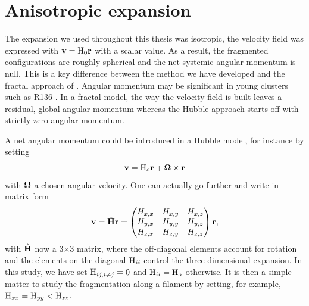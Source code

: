 \section{Anisotropic expansion}

The \HubLem expansion we used throughout this thesis was isotropic, the velocity field was expressed with $\bold{v} = {\textrm{H}}_0 \bold{r}$ with \tHub a scalar value. As a result, the fragmented configurations are roughly spherical and the net systemic angular momentum is null. This is a key difference between the method we have developed and the fractal approach of \cite{Goodwin2004}. Angular momentum may be significant in young clusters such as R136 \citep{Henault-Brunet2012}. In a fractal model, the way the velocity field is built leaves a residual, global angular momentum whereas the Hubble approach starts off with strictly zero angular momentum.

 A net angular momentum could be introduced in a Hubble model, for instance by setting 
\begin{equation}
\bold{v} = {\textrm{H}}_o \bold{r} + \bold{\Omega} \times \bold{r}
\end{equation} 
with $\bold{\Omega}$ a chosen angular velocity. One can actually go further and write in matrix form
\begin{equation}
\bold{v} = \hat{\bold{H}} \bold{r} = \left(\begin{matrix}
H_{x,x} & H_{x,y} & H_{x,z}\\
H_{y,x} & H_{y,y} & H_{y,z}\\
H_{z,x} & H_{z,y} & H_{z,z}\\
\end{matrix}\right) \bold{r},
\end{equation}
with $\hat{\bold{H}}$ now a 3$\times$3 matrix, where the off-diagonal elements account for rotation and the elements on the diagonal ${\textrm{H}}_{ii}$ control the three dimensional expansion. In this study, we have set ${\textrm{H}}_{ij,i\ne j}=0$ and ${\textrm{H}}_{ii}={\textrm{H}}_o$ otherwise. It is then a simple matter to study the fragmentation along a filament by setting, for example, ${\textrm{H}}_{xx}={\textrm{H}}_{yy} < {\textrm{H}}_{zz}$. 


